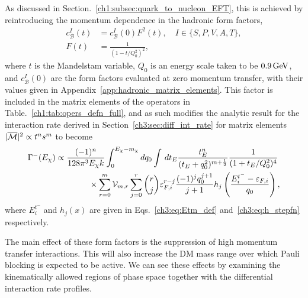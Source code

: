 As discussed in Section.~\ref{ch1:subsec:quark_to_nucleon_EFT}, this is achieved by reintroducing the momentum dependence in the hadronic form factors, 
\begin{align}
   c_\mathcal{B}^I(t)  &= c_\mathcal{B}^{I}(0) F^2(t),\quad I\in\{S, P, V, A, T\},\\
   F(t) & = \frac{1}{(1 - t/Q_0^2)^2},\label{ch5:eq:FF_def}
\end{align}
where $t$ is the Mandelstam variable, $Q_0$ is an energy scale taken to be $0.9{\rm \,GeV}$, and $c_\mathcal{B}^I(0)$ are the form factors evaluated at zero momentum transfer, with their values given in Appendix~\ref{app:hadronic_matrix_elements}. This factor is included in the matrix elements of the operators in Table.~\ref{ch1:tab:opers_defn_full}, and as such modifies the analytic result for the interaction rate derived in Section~\ref{ch3:sec:diff_int_rate} for matrix elements $|\overline{\mathcal M}|^2 \propto t^n s^m$ to become
\begin{equation}
   \begin{split}
       \Gamma^{-}(E_\chi) & \propto \frac{(-1)^n }{128\pi^3 E_\chi k }\int_0^{E_\chi -m_\chi} dq_0\int \, dt_E \frac{ t_E^n}{(t_E + q_0^2)^{m+\frac{1}{2}}}\frac{1}{(1 + t_E/Q_0^2)^4}\\
       &\hspace{4em}\times\sum_{r=0}^m \mathcal{V}_{m,r}\sum_{j = 0}^r\binom{r}{j} \varepsilon_{F,i}^{r-j}  \frac{(-1)^{j} q_0^{j+1}}{j+1} h_j\left( \frac{E_i^{t^-} - \varepsilon_{F,i}}{q_0}\right),
   \end{split}
   \label{ch5:eq:gammaFFfinaltext}
\end{equation}
where $E_i^{t^-}$ and $h_j(x)$ are given in Eqs.~\ref{ch3:eq:Etm_def} and~\ref{ch3:eq:h_stepfn} respectively.

The main effect of these form factors is the suppression of high momentum transfer interactions. This will also increase the DM mass range over which Pauli blocking is expected to be active. We can see these effects by examining the kinematically allowed regions of phase space together with the differential interaction rate profiles.


